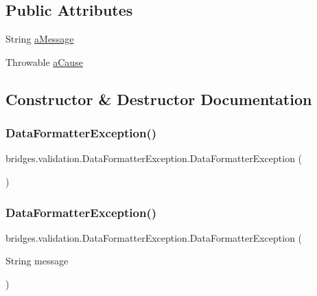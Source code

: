 \subsection*{Public Attributes}
\begin{DoxyCompactItemize}
\item 
String \mbox{\hyperlink{classbridges_1_1validation_1_1_data_formatter_exception_a8cab4688a8a80a0575bcda28e6ac7b8c}{a\+Message}}
\item 
Throwable \mbox{\hyperlink{classbridges_1_1validation_1_1_data_formatter_exception_ad2fdeb878690d9fc23f1316f55696ffd}{a\+Cause}}
\end{DoxyCompactItemize}


\subsection{Constructor \& Destructor Documentation}
\mbox{\label{classbridges_1_1validation_1_1_data_formatter_exception_aa922b9fa359b89c0b25eaa1efd0cfd07}} 
\subsubsection{\texorpdfstring{DataFormatterException()}{DataFormatterException()}\hspace{0.1cm}{\footnotesize\ttfamily [1/4]}}
{\footnotesize\ttfamily bridges.\+validation.\+Data\+Formatter\+Exception.\+Data\+Formatter\+Exception (\begin{DoxyParamCaption}{ }\end{DoxyParamCaption})}

\mbox{\label{classbridges_1_1validation_1_1_data_formatter_exception_abadd66eb3ea98c1af1ff397912ed73bf}} 
\subsubsection{\texorpdfstring{DataFormatterException()}{DataFormatterException()}\hspace{0.1cm}{\footnotesize\ttfamily [2/4]}}
{\footnotesize\ttfamily bridges.\+validation.\+Data\+Formatter\+Exception.\+Data\+Formatter\+Exception (\begin{DoxyParamCaption}\item[{String}]{message }\end{DoxyParamCaption})}


